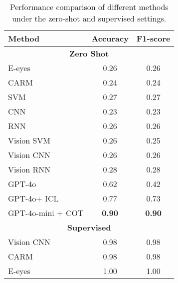 
\begin{table}[th]
    \centering
    \small
    \begin{tabular}{lcc}
        \toprule
        \textbf{Method} & \textbf{Accuracy} & \textbf{F1-score} \\
        \midrule
        \multicolumn{3}{c}{\textbf{Zero Shot}} \\
         \midrule
         E-eyes & 0.26 & 0.26 \\
         CARM & 0.24 & 0.24 \\
         SVM & 0.27 & 0.27 \\
         CNN & 0.23 & 0.23 \\
         RNN & 0.26 & 0.26 \\
        Vision SVM & 0.26 & 0.25 \\
        Vision CNN & 0.26 & 0.26 \\
        Vision RNN & 0.28 & 0.28 \\
        GPT-4o & 0.62 & 0.42 \\
        GPT-4o+ ICL & 0.77 & 0.73 \\
        GPT-4o-mini + COT & \textbf{0.90} & \textbf{0.90} \\
        \midrule
        \multicolumn{3}{c}{\textbf{Supervised}} \\
         \midrule
        Vision CNN & 0.98 & 0.98 \\
        CARM & 0.98 & 0.98 \\
        E-eyes & 1.00 & 1.00 \\
        \bottomrule
    \end{tabular}
    
    \caption{Performance comparison of different methods under the zero-shot and supervised settings.}
    \label{present}
\end{table}




